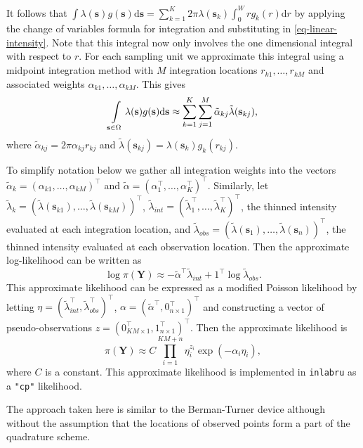 \documentclass{stylefile16/statsoc}
\newcommand{\bs}{\mathbf{s}}
\newcommand{\bm}{\boldsymbol}  %
\newcommand{\tl}{\tilde{\lambda}}   %
\begin{document}
It follows that $\int \lambda(\bs)g(\bs) \mathrm{d}\bs = \sum_{k=1}^K 2\pi \lambda(\bs_k) \int_0^W r g_k(r)\mathrm{d}r$ by applying the change of variables formula for integration and substituting in \eqref{eq-linear-intensity}.  Note that this integral now only involves the one dimensional integral with respect to $r$.  For each sampling unit we approximate this integral using a midpoint integration method with $M$ integration locations $r_{k1}, \ldots, r_{kM}$ and associated weights $\alpha_{k1}, \ldots, \alpha_{kM}$.  This gives
\begin{equation*}
	\int\displaylimits_{\bs \in \Omega} \lambda(\bs)g(\bs)\mathrm{d}\bs \approx \sum_{k=1}^K \sum_{j=1}^M \tilde{\alpha}_{kj} \tl(\bs_{kj}) ,
\end{equation*}
where $\tilde{\alpha}_{kj} = 2\pi \alpha_{kj}r_{kj}$ and $\tl(\bs_{kj}) = \lambda(\bs_k) g_k(r_{kj})$.

To simplify notation below we gather all integration weights into the vectors $\tilde{\alpha}_{k} = (\alpha_{k1}, \ldots, \alpha_{kM})^\intercal$ and $\tilde{\alpha} = (\alpha_1^\intercal, \ldots, \alpha_K^\intercal)^\intercal$.  Similarly, let $\tl_k = (\tl(\bs_{k1}), \ldots, \tl(\bs_{kM}))^\intercal$, $\tl_{int} = (\tl_1^\intercal, \ldots, \tl_K^\intercal)^\intercal$, the thinned intensity evaluated at each integration location, and $\tl_{obs} = (\tl(\bs_1), \ldots, \tl(\bs_n))^\intercal$, the thinned intensity evaluated at each observation location.  Then the approximate log-likelihood can be written as
\begin{equation}
\label{approx-log-likelihood}
	\log \pi(\bm{Y}) \approx - \tilde{\alpha}^\intercal \tl_{int} + 1^\intercal\log\tl_{obs}.
\end{equation}
This approximate likelihood can be expressed as a modified Poisson likelihood by letting $\eta = (\tl_{int}^\intercal, \tl_{obs}^\intercal)^\intercal$,
$\alpha = (\tilde{\alpha}^\intercal, 0_{n \times 1}^\intercal)^\intercal$ and constructing a vector of pseudo-observations $z = (0_{KM\times 1}^\intercal, 1_{n \times 1}^\intercal)^\intercal$.  Then the approximate likelihood is
\begin{equation}
\pi(\bm{Y}) \approx C \prod\limits_{i=1}^{KM + n} \eta_i^{z_i}\exp(-\alpha_i\eta_i),
\end{equation}
where $C$ is a constant.  This approximate likelihood is implemented in \texttt{inlabru} as a \texttt{"cp"} likelihood.  

The approach taken here is similar to the Berman-Turner device \citep{berman_approximating_1992, baddeley_practical_2000} although without the assumption that the locations of observed points form a part of the quadrature scheme.
\end{document}

